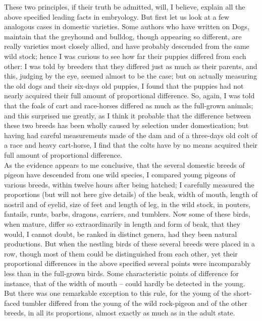 \indent These two principles, if their truth be admitted, will, I believe, explain all the above specified leading facts in embryology. But first let us look at a few analogous cases in domestic varieties. Some authors who have written on Dogs, maintain that the greyhound and bulldog, though appearing so different, are really varieties most closely allied, and have probably descended from the same wild stock; hence I was curious to see how far their puppies differed from each other: I was told by breeders that they differed just as much as their parents, and this, judging by the eye, seemed almost to be the case; but on actually measuring the old dogs and their six-days old puppies, I found that the puppies had not nearly acquired their full amount of proportional difference. So, again, I was told that the foals of cart and race-horses differed as much as the full-grown animals; and this surprised me greatly, as I think it probable that the difference between these two breeds has been wholly caused by selection under domestication; but having had careful measurements made of the dam and of a three-days old colt of a race and heavy cart-horse, I find that the colts have by no means acquired their full amount of proportional difference.~\\
\indent As the evidence appears to me conclusive, that the several domestic breeds of pigeon have descended from one wild species, I compared young pigeons of various breeds, within twelve hours after being hatched; I carefully measured the proportions (but will not here give details) of the beak, width of mouth, length of nostril and of eyelid, size of feet and length of leg, in the wild stock, in pouters, fantails, runts, barbs, dragons, carriers, and tumblers. Now some of these birds, when mature, differ so extraordinarily in length and form of beak, that they would, I cannot doubt, be ranked in distinct genera, had they been natural productions. But when the nestling birds of these several breeds were placed in a row, though most of them could be distinguished from each other, yet their proportional differences in the above specified several points were incomparably less than in the full-grown birds. Some characteristic points of difference for instance, that of the width of mouth -- could hardly be detected in the young. But there was one remarkable exception to this rule, for the young of the short-faced tumbler differed from the young of the wild rock-pigeon and of the other breeds, in all its proportions, almost exactly as much as in the adult state.~\\

